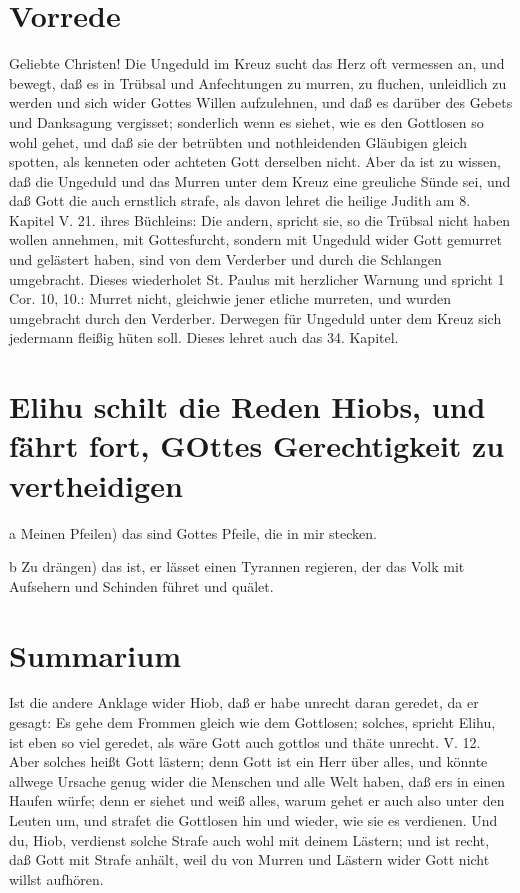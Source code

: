 \section{Vorrede}

Geliebte Christen! Die Ungeduld im Kreuz sucht das Herz oft vermessen an, und bewegt, daß es in Trübsal und Anfechtungen zu murren, zu fluchen, unleidlich zu werden und sich wider Gottes Willen aufzulehnen, und daß es darüber des Gebets und Danksagung vergisset; sonderlich wenn es siehet, wie es den Gottlosen so wohl gehet, und daß sie der betrübten und nothleidenden Gläubigen gleich spotten, als kenneten oder achteten Gott derselben nicht. Aber da ist zu wissen, daß die Ungeduld und das Murren unter dem Kreuz eine greuliche Sünde sei, und daß Gott die auch ernstlich strafe, als davon lehret die heilige Judith am 8. Kapitel V. 21. ihres Büchleins: Die andern, spricht sie, so die Trübsal nicht haben wollen annehmen, mit Gottesfurcht, sondern mit Ungeduld wider Gott gemurret und gelästert haben, sind von dem Verderber und durch die Schlangen umgebracht. Dieses wiederholet St. Paulus mit herzlicher Warnung
und spricht 1 Cor. 10, 10.: Murret nicht, gleichwie jener etliche murreten, und wurden umgebracht durch den Verderber. Derwegen für Ungeduld unter dem Kreuz sich jedermann fleißig hüten soll. Dieses lehret auch das 34. Kapitel.

\section[Elihu schilt die Reden Hiobs, und fährt fort,]{Elihu schilt die Reden Hiobs, und fährt fort, GOttes Gerechtigkeit zu vertheidigen}

a Meinen Pfeilen) das sind Gottes Pfeile, die in mir stecken.

b Zu drängen) das ist, er lässet einen Tyrannen regieren, der das Volk mit Aufsehern und Schinden führet und quälet.

\section{Summarium}

Ist die andere Anklage wider Hiob, daß er habe unrecht daran geredet, da er gesagt: Es gehe dem Frommen gleich wie dem Gottlosen; solches, spricht Elihu, ist eben so viel geredet, als wäre Gott auch gottlos und thäte unrecht. V. 12. Aber solches heißt Gott lästern; denn Gott ist ein Herr über alles, und könnte allwege Ursache genug wider die Menschen und alle Welt haben, daß ers in einen Haufen würfe; denn er siehet und weiß alles, warum gehet er auch also unter den Leuten um, und strafet die Gottlosen hin und wieder, wie sie es verdienen. Und du, Hiob, verdienst solche Strafe auch wohl mit deinem Lästern; und ist recht, daß Gott mit Strafe anhält, weil du von Murren und Lästern wider Gott nicht willst aufhören.

